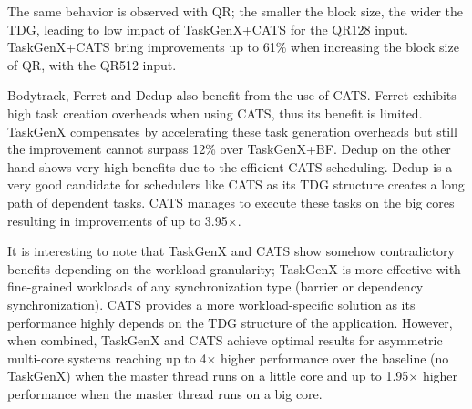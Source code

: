 The same behavior is observed with QR; the smaller the block size, the wider the TDG, leading to low impact of TaskGenX+CATS for the QR128 input.
TaskGenX+CATS bring improvements up to 61\% when increasing the block size of QR, with the QR512 input.

Bodytrack, Ferret and Dedup also benefit from the use of CATS.
Ferret exhibits high task creation overheads when using CATS, thus its benefit is limited.
TaskGenX compensates by accelerating these task generation overheads but still the improvement cannot surpass 12\% over TaskGenX+BF.
Dedup on the other hand shows very high benefits due to the efficient CATS scheduling.
Dedup is a very good candidate for schedulers like CATS as its TDG structure creates a long path of dependent tasks.
CATS manages to execute these tasks on the big cores resulting in improvements of up to 3.95$\times$.

It is interesting to note that TaskGenX and CATS show somehow contradictory benefits depending on the workload granularity;
TaskGenX is more effective with fine-grained workloads of any synchronization type (barrier or dependency synchronization). 
CATS provides a more workload-specific solution as its performance highly depends on the TDG structure of the application.
However, when combined, TaskGenX and CATS achieve optimal results for asymmetric multi-core systems reaching up to 4$\times$ higher performance over the baseline (no TaskGenX) when the master thread runs on a little core and up to 1.95$\times$ higher performance when the master thread runs on a big core.

